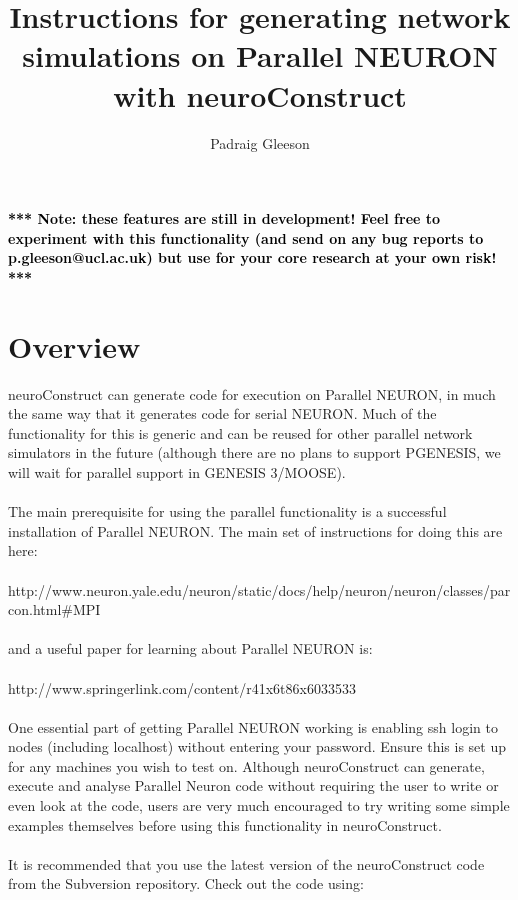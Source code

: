 \documentclass[11pt]{article}
\begin{document}
\title{Instructions for generating network simulations on Parallel NEURON with neuroConstruct}
\author{Padraig Gleeson}

\maketitle

\begin{center}
\textbf{\textcolor{black}{*** Note: these features are still in development! Feel free to experiment with this functionality (and send on any bug reports to p.gleeson@ucl.ac.uk) but use for your core research at your own risk! ***}}
\end{center}

\section {Overview}
neuroConstruct can generate code for execution on Parallel NEURON, in much the same way that it generates code for serial NEURON. Much of the functionality for this is generic and can be reused for other parallel network simulators in the future (although there are no plans to support PGENESIS, we will wait for parallel support in GENESIS 3/MOOSE).
\\\\The main prerequisite for using the parallel functionality is a successful installation of Parallel NEURON. The main set of instructions for doing this are here: 
\\\\
http://www.neuron.yale.edu/neuron/static/docs/help/neuron/neuron/classes/parcon.html\#MPI
\\\\
and a useful paper for learning about Parallel NEURON is:
\\\\
http://www.springerlink.com/content/r41x6t86x6033533
\\\\
One essential part of getting Parallel NEURON working is enabling ssh login to nodes (including localhost) without entering your password. Ensure this is set up for any machines you wish to test on. Although neuroConstruct can generate, execute and analyse Parallel Neuron code without requiring the user to write or even look at the code, users are very much encouraged to try writing some simple examples themselves before using this functionality in neuroConstruct.
\\\\It is recommended that you use the latest version of the neuroConstruct code from the Subversion repository. Check out the code using:
\end{document}
